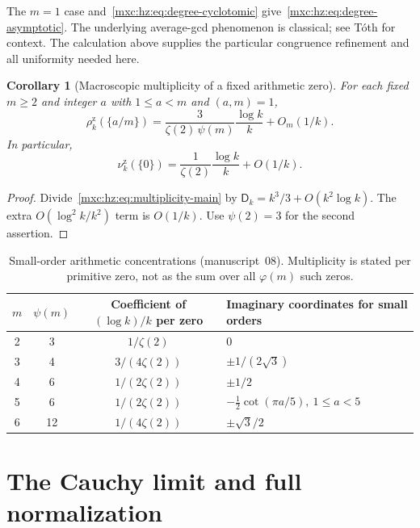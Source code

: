\documentclass[11pt]{article}
\numberwithin{equation}{section}
\newtheorem{corollary}[theorem]{Corollary}
\theoremstyle{definition}
\theoremstyle{remark}
\newcommand{\hzrho}{\rho^{\mathrm z}}
\newcommand{\hznu}{\nu^{\mathrm z}}
\begin{document}
The $m=1$ case and~\eqref{mxc:hz:eq:degree-cyclotomic}
give~\eqref{mxc:hz:eq:degree-asymptotic}. The underlying average-gcd
phenomenon is classical; see T\'oth \cite{hztoth} for context. The
calculation above supplies the particular congruence refinement and all
uniformity needed here.

\begin{corollary}[Macroscopic multiplicity of a fixed arithmetic zero]
\label{mxc:hz:cor:fixed-atom}
For each fixed $m\ge2$ and integer $a$ with $1\le a<m$ and $(a,m)=1$,
\begin{equation}\label{mxc:hz:eq:normalized-multiplicity}
 \hzrho_k(\{a/m\})
 =\frac{3}{\zeta(2)\,\psi(m)}\frac{\log k}{k}+O_m(1/k).
\end{equation}
In particular,
\begin{equation}\label{mxc:hz:eq:central-atom}
 \hznu_k(\{0\})=\frac1{\zeta(2)}\frac{\log k}{k}+O(1/k).
\end{equation}
\end{corollary}

\begin{proof}
Divide~\eqref{mxc:hz:eq:multiplicity-main} by
$\mathsf D_k=k^3/3+O(k^2\log k)$. The extra $O(\log^2k/k^2)$ term is
$O(1/k)$. Use $\psi(2)=3$ for the second assertion.
\end{proof}

\begin{table}[htbp]
\centering\small
\begin{tabular}{@{}cccl@{}}
\toprule
$m$&$\psi(m)$&Coefficient of $(\log k)/k$ per zero&
Imaginary coordinates for small orders\\
\midrule
2&3&$1/\zeta(2)$&$0$\\
3&4&$3/(4\zeta(2))$&$\pm1/(2\sqrt3)$\\
4&6&$1/(2\zeta(2))$&$\pm1/2$\\
5&6&$1/(2\zeta(2))$&$-\frac12\cot(\pi a/5),\ 1\le a<5$\\
6&12&$1/(4\zeta(2))$&$\pm\sqrt3/2$\\
\bottomrule
\end{tabular}
\caption{Small-order arithmetic concentrations (manuscript~08).
Multiplicity is stated per primitive zero, not as the sum over all
$\varphi(m)$ such zeros.}
\label{mxc:hz:tab:arithmetic-atoms}
\end{table}

\section{The Cauchy limit and full normalization}\label{mxc:hz:sec:bulk}
\end{document}
